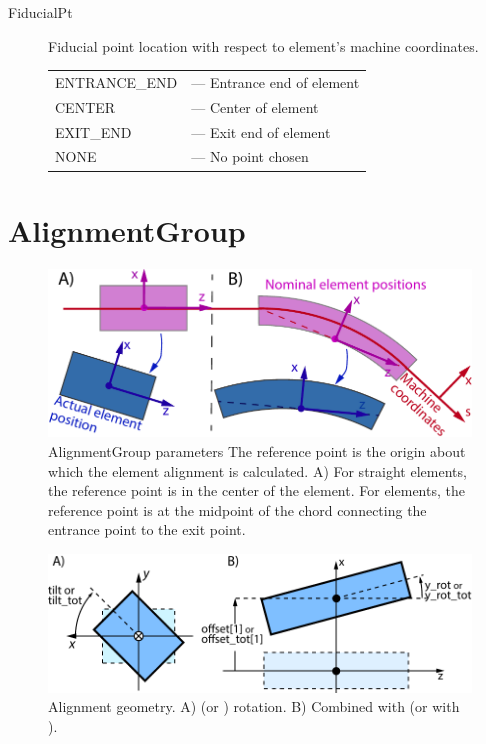 \begin{description}
\begin{tabular}{ll}
\end{tabular}
%
\item[FiducialPt] Fiducial point location with respect to element's machine coordinates. \Newline
\hspace*{-20pt}
\begin{tabular}{ll}
  ENTRANCE_END & --- Entrance end of element \\
  CENTER       & --- Center of element \\
  EXIT_END     & --- Exit end of element \\
  NONE         & --- No point chosen \\
\end{tabular}
%
\end{description}

\section{AlignmentGroup}
\label{s:align.g}

\begin{figure}
\centering \includegraphics{alignment-ref.pdf} 
\caption[Element alignment.]  
{AlignmentGroup parameters The reference point is the origin
about which the element alignment is calculated. 
A) For straight elements, the reference point is in the center of the element. 
For  elements, the reference point is at the midpoint of the chord connecting
the entrance point to the exit point.
}  \label{f:alignment}
\end{figure}

\begin{figure}
\centering \includegraphics{alignment2.pdf} \caption[Alignment geometry.]  
{Alignment geometry. A)  (or ) rotation. B) Combined
 with  (or  with ).
}  \label{f:alignment}
\end{figure}

